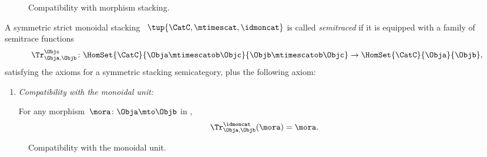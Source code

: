 
\begin{figure}[h!]
    \centering
    \caption{Compatibility with morphism stacking.}
    \label{fig:axiomatic-semicat-semitrace-superposing}
\end{figure}

\begin{ctdefinition}
    \label{def:semitraced-strict-mon-scat}
    A symmetric strict monoidal stacking ~$\tup{\CatC, \mtimescat, \idmoncat }$ is called \emph{semitraced} if it is equipped with a family of semitrace functions
    \begin{equation}
        \Tr_{\Obja,\Objb}^\Objc\colon \HomSet{\CatC}{\Obja \mtimescatob \Objc}{\Objb\mtimescatob \Objc}\to \HomSet{\CatC}{\Obja}{\Objb},
    \end{equation}
    satisfying the axioms for a symmetric stacking semicategory, plus the following axiom:
    \begin{enumerate}

        \item \emph{Compatibility with the monoidal unit:}

              For any morphism~$\mora \colon \Obja\mto \Objb$ in \CatC,
              \begin{equation}
                  \label{eq:semicat-semitrace-vanishing_1}
                  \Tr_{\Obja,\Objb}^\idmoncat (\mora)=\mora.
              \end{equation}

    \end{enumerate}
\end{ctdefinition}

\begin{figure}[h!]
    \centering
    \caption{Compatibility with the monoidal unit.}
    \label{fig:axiomatic-semicat-semitrace-vanishing-I}
\end{figure}

